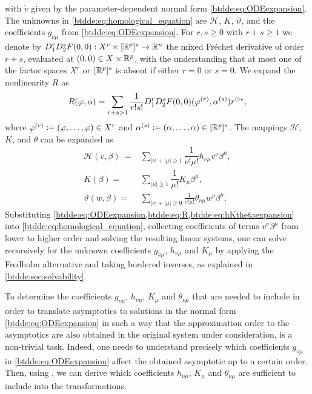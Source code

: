 with $\dot{v}$ given by the parameter-dependent normal form
\cref{btdde:eq:ODEexpansion}. The unknowns in \cref{btdde:eq:homological_equation} are
$\mathcal{H}$, $K$, $\vartheta$, and the coefficients $g_{\nu\mu}$ from
\cref{btdde:eq:ODEexpansion}. For $r, s \ge 0$ with $r + s \ge 1$ we denote by
$D_1^rD_2^sF(0,0) : X^r \times [\mathbb{R}^p]^s \rightarrow \mathbb{R}^n$ the mixed Fr\'echet
derivative of order $r + s$, evaluated at $(0,0) \in X \times \mathbb{R}^p$, with the
understanding that at most one of the factor spaces $X^r$ or $[\mathbb{R}^p]^s$ is
absent if either $r = 0$ or $s = 0$. We expand the nonlinearity $R$ as
\begin{equation}
  \label{btdde:eq:R}
  R(\varphi,\alpha) = \sum_{r + s > 1}\frac{1}{r!s!}D_1^rD_2^sF(0,0)(\varphi^{(r)},\alpha^{(s)})r^{\odot\star},
\end{equation}
where $\varphi^{(r)} \coloneqq (\varphi,\dots,\varphi)\in X^r$ and $\alpha^{(s)} \coloneqq
(\alpha,\dots,\alpha)\in [\mathbb{R}^p]^s$. The mappings $\mathcal{H}$, $K$, and
$\theta$ can be expanded as
\begin{equation}
\label{btdde:eq:hKthetaexpansion}
\begin{aligned}
    \mathcal{H}(v,\beta)\ ={}& \sum_{|\nu| + |\mu| \geq 1}\dfrac{1}{\nu!\mu!}h_{\nu\mu}v^{\nu}\beta^{\mu}, \\
    K(\beta) ={}& \sum_{|\mu| \geq 1}\dfrac{1}{\mu!}K_{\mu}\beta^{\mu}, \\
    \vartheta(w, \beta) ={}& \sum_{|\nu|+|\mu| \geq 0} \frac1{\nu!\mu!} \theta_{\nu\mu} w^\nu \beta^\mu.
\end{aligned}
\end{equation}
Substituting \cref{btdde:eq:ODEexpansion,btdde:eq:R,btdde:eq:hKthetaexpansion} into
\cref{btdde:eq:homological_equation}, collecting coefficients of terms
$v^{\nu}\beta^{\mu}$ from lower to higher order and solving the resulting
linear systems, one can solve recursively for the unknown coefficients
$g_{\nu\mu}$, $h_{\nu\mu}$ and $K_{\mu}$ by applying the Fredholm alternative
and taking bordered inverses, as explained in \cref{btdde:sec:solvability}.

\begin{remark}
To determine the coefficients $g_{\nu\mu}$, $h_{\nu\mu}$, $K_{\mu}$ and
$\theta_{\nu\mu}$ that are needed to include in order to translate asymptotics
to solutions in the normal form \cref{btdde:eq:ODEexpansion} in such a way that
the approximation order to the asymptotics are also obtained in the original
system under consideration, is a non-trivial task. Indeed, one needs to
understand precisely which coefficients $g_{\nu\mu}$ in
\cref{btdde:eq:ODEexpansion} affect the obtained asymptotic up to a certain
order. Then, using \cite[Proposition 1]{Bosschaert@Interplay}, we can derive
which coefficients $h_{\nu\mu}$, $K_{\mu}$ and $\theta_{\nu\mu}$ are sufficient
to include into the transformations.
\end{remark}

